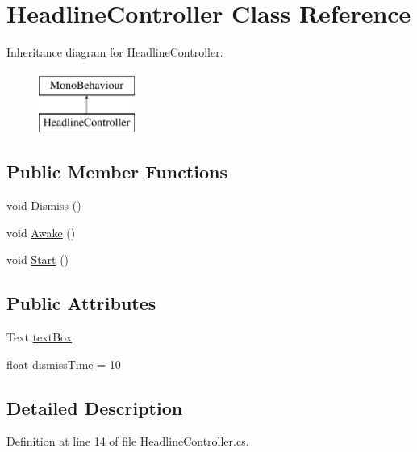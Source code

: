 \hypertarget{class_headline_controller}{}\section{Headline\+Controller Class Reference}
\label{class_headline_controller}
Inheritance diagram for Headline\+Controller\+:\begin{figure}[H]
\begin{center}
\leavevmode
\includegraphics[height=2.000000cm]{class_headline_controller}
\end{center}
\end{figure}
\subsection*{Public Member Functions}
\begin{DoxyCompactItemize}
\item 
void \hyperlink{class_headline_controller_acd329fcd0eb7c55ceecdf01d14774847}{Dismiss} ()
\item 
void \hyperlink{class_headline_controller_adb69e776ca5b30c61080f59057ad1137}{Awake} ()
\item 
void \hyperlink{class_headline_controller_afdc68788b7f96aad60909e794e55d647}{Start} ()
\end{DoxyCompactItemize}
\subsection*{Public Attributes}
\begin{DoxyCompactItemize}
\item 
Text \hyperlink{class_headline_controller_a6bb8f23f70364f69e66645602a011fa7}{text\+Box}
\item 
float \hyperlink{class_headline_controller_ac3dd2838ff920e0b2c269b79a6bfac9c}{dismiss\+Time} = 10
\end{DoxyCompactItemize}


\subsection{Detailed Description}


Definition at line 14 of file Headline\+Controller.\+cs.



